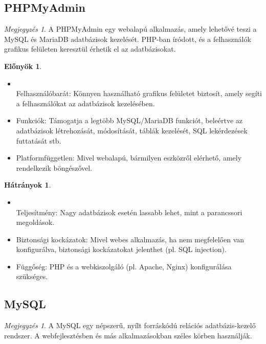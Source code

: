\documentclass[colorlinks]{thesis-kando}
\theoremstyle{definition}
\newtheorem{elonyok}{Előnyök}
\newtheorem{hatranyok}{Hátrányok}
\theoremstyle{remark}
\newtheorem{megjegyzes}[tetel]{Megjegyzés}
\begin{document}
\subsection{PHPMyAdmin}
\begin{megjegyzes}
    A PHPMyAdmin egy webalapú alkalmazás, amely lehetővé teszi a MySQL és MariaDB adatbázisok kezelését. PHP-ban íródott, és a felhasználók grafikus felületen keresztül érhetik el az adatbázisokat.
\end{megjegyzes}

\begin{elonyok}

\begin{itemize}

    \item \mbox{} \\Felhasználóbarát: Könnyen használható grafikus felületet biztosít, amely segíti a felhasználókat az adatbázisok kezelésében.
    \item Funkciók: Támogatja a legtöbb MySQL/MariaDB funkciót, beleértve az adatbázisok létrehozását, módosítását, táblák kezelését, SQL lekérdezések futtatását stb.
    \item Platformfüggetlen: Mivel webalapú, bármilyen eszközről elérhető, amely rendelkezik böngészővel.

\end{itemize}
\end{elonyok}

\begin{hatranyok}
 
\begin{itemize}
    \item \mbox{} \\Teljesítmény: Nagy adatbázisok esetén lassabb lehet, mint a parancssori megoldások.
    \item Biztonsági kockázatok: Mivel webes alkalmazás, ha nem megfelelően van konfigurálva, biztonsági kockázatokat jelenthet (pl. SQL injection).
    \item Függőség: PHP és a webkiszolgáló (pl. Apache, Nginx) konfigurálása szükséges.
\end{itemize}
\end{hatranyok}
\subsection{MySQL}

\begin{megjegyzes}
    A MySQL egy népszerű, nyílt forráskódú relációs adatbázis-kezelő rendszer. A webfejlesztésben és más alkalmazásokban széles körben használják.
\end{megjegyzes}
\end{document}
